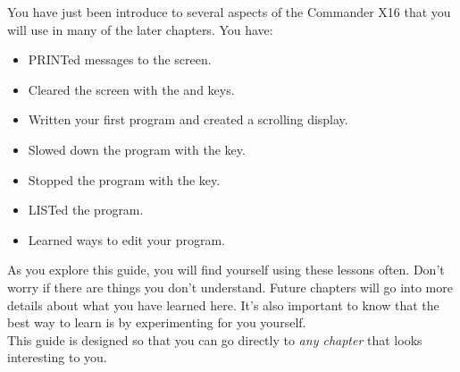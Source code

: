 You have just been introduce to several aspects of the Commander X16 that you
will use in many of the later chapters.  You have:

\begin{itemize}

	\item {\ttfamily PRINT}ed messages to the screen.

	\item Cleared the screen with the  and 
		keys.
	
	\item Written your first program and created a scrolling display.
	
	\item Slowed down the program with the  key.

	\item Stopped the program with the  key.

	\item {\ttfamily LIST}ed the program.

	\item Learned ways to edit your program.

\end{itemize}

\vspace{16pt}

As you explore this guide, you will find yourself using these lessons often.
Don't worry if there are things you don't understand.  Future chapters will go
into more details about what you have learned here.  It's also important to
know that the best way to learn is by experimenting for you yourself.\\

This guide is designed so that you can go directly to \emph{any chapter} that
looks interesting to you.


\@openrighttrue\makeatother
